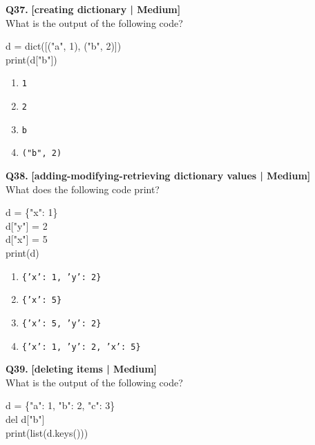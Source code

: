 \noindent\textbf{Q37.} \hfill {\small\color{LPUOrange}\textbf{[creating dictionary | Medium]}}\\[2pt]
What is the output of the following code? 

\begin{pycode}
d = dict([("a", 1), ("b", 2)])\\
print(d["b"])
\end{pycode}

\begin{enumerate}[label=(\alph*),topsep=2pt,itemsep=1pt,partopsep=0pt,parsep=0pt]
    \item \relax \texttt{1}
    \item \relax \texttt{2}
    \item \relax \texttt{b}
    \item \relax \texttt{("b", 2)}
\end{enumerate}
\vspace{2mm}

\noindent\textbf{Q38.} \hfill {\small\color{LPUOrange}\textbf{[adding-modifying-retrieving dictionary values | Medium]}}\\[2pt]
What does the following code print? 

\begin{pycode}
d = \{"x": 1\}\\
d["y"] = 2\\
d["x"] = 5\\
print(d)
\end{pycode}

\begin{enumerate}[label=(\alph*),topsep=2pt,itemsep=1pt,partopsep=0pt,parsep=0pt]
    \item \relax \texttt{\{'x': 1, 'y': 2\}}
    \item \relax \texttt{\{'x': 5\}}
    \item \relax \texttt{\{'x': 5, 'y': 2\}}
    \item \relax \texttt{\{'x': 1, 'y': 2, 'x': 5\}}
\end{enumerate}
\vspace{2mm}

\noindent\textbf{Q39.} \hfill {\small\color{LPUOrange}\textbf{[deleting items | Medium]}}\\[2pt]
What is the output of the following code? 

\begin{pycode}
d = \{"a": 1, "b": 2, "c": 3\}\\
del d["b"]\\
print(list(d.keys()))
\end{pycode}

